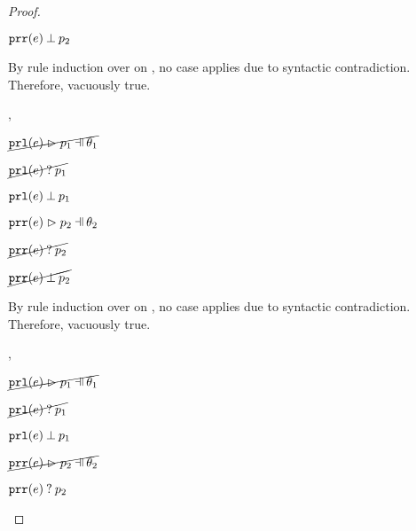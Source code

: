 \begin{proof}
\begin{byCases}
\begin{byCases}
\begin{byCases}
\begin{pfsteps*}
            \item $\mathtt{prr}(e) \mathbin{\bot} p_2$  
            \end{pfsteps*}
            By rule induction over  on , no case applies due to syntactic contradiction.\\
            Therefore, vacuously true.
        \item[\hnotmatch{\hprl{e}}{p_1},\hpatmatch{\hprr{e}}{p_2}{\theta_2}]
            \begin{pfsteps*}
            \item $\cancel{\hpatmatch{\hprl{e}}{p_1}{\theta_1}}$  
            \item $\cancel{\mathtt{prl}(e) \mathbin{?} p_1}$  
            \item $\mathtt{prl}(e) \mathbin{\bot} p_1$  
            \item $\hpatmatch{\hprr{e}}{p_2}{\theta_2}$  
            \item $\cancel{\mathtt{prr}(e) \mathbin{?} p_2}$  
            \item $\cancel{\mathtt{prr}(e) \mathbin{\bot} p_2}$  
            \end{pfsteps*}
            By rule induction over  on , no case applies due to syntactic contradiction.\\
            Therefore, vacuously true.
        \item[\hnotmatch{\hprl{e}}{p_1},\hmaymatch{\hprr{e}}{p_2}]
            \begin{pfsteps*}
            \item $\cancel{\hpatmatch{\hprl{e}}{p_1}{\theta_1}}$  
            \item $\cancel{\mathtt{prl}(e) \mathbin{?} p_1}$  
            \item $\mathtt{prl}(e) \mathbin{\bot} p_1$  
            \item $\cancel{\hpatmatch{\hprr{e}}{p_2}{\theta_2}}$  
            \item $\mathtt{prr}(e) \mathbin{?} p_2$  

\end{pfsteps*}
\end{byCases}
\end{byCases}
\end{byCases}
\end{proof}
